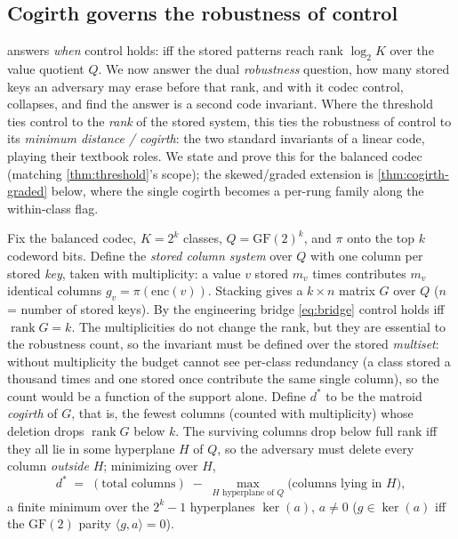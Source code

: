 \documentclass[11pt]{article}
\theoremstyle{definition}
\theoremstyle{plain}
\theoremstyle{remark}
\newcommand{\enc}{\mathrm{enc}}
\newcommand{\GF}{\mathrm{GF}(2)}
\DeclareMathOperator{\rank}{rank}
\newcommand{\proj}{\pi}                     %
\newcommand{\Quot}{Q}                       %
\begin{document}
\subsection{Cogirth governs the robustness of control}
\label{sec:t5b}

 answers \emph{when} control holds: iff the stored patterns reach rank
$\log_2 K$ over the value quotient $\Quot$. We now answer the dual \emph{robustness}
question, how many stored keys an adversary may erase before that rank, and with it codec
control, collapses, and find the answer is a second code invariant. Where the threshold
ties control to the \emph{rank} of the stored system, this ties the robustness of control
to its \emph{minimum distance / cogirth}: the two standard invariants of a linear code,
playing their textbook roles. We state and prove this for the balanced codec (matching
\cref{thm:threshold}'s scope); the skewed/graded extension is \cref{thm:cogirth-graded}
below, where the single cogirth becomes a per-rung family along the within-class flag.

Fix the balanced codec, $K = 2^k$ classes, $\Quot = \GF^k$, and $\proj$ onto the top $k$
codeword bits. Define the \emph{stored column system} over $\Quot$ with one column per
stored \emph{key}, taken with multiplicity: a value $v$ stored $m_v$ times contributes
$m_v$ identical columns $g_v = \proj(\enc(v))$. Stacking gives a $k \times n$ matrix $G$
over $\Quot$ ($n$ = number of stored keys). By the engineering bridge \eqref{eq:bridge}
control holds iff $\rank G = k$. The multiplicities do not change the rank, but they are
essential to the robustness count, so the invariant must be defined over the stored
\emph{multiset}: without multiplicity the budget cannot see per-class redundancy (a class
stored a thousand times and one stored once contribute the same single column), so the count
would be a function of the support alone. Define $d^\ast$ to be the matroid \emph{cogirth} of $G$, that is, the
fewest columns (counted with multiplicity) whose deletion drops $\rank G$ below $k$.
The surviving columns drop below full rank iff they all lie in some hyperplane $H$ of
$\Quot$, so the adversary must delete every column \emph{outside} $H$; minimizing over $H$,
\begin{equation}
  d^\ast \;=\; (\text{total columns}) \;-\; \max_{H \text{ hyperplane of } \Quot}
              \big(\text{columns lying in } H\big),
  \label{eq:cogirth}
\end{equation}
a finite minimum over the $2^k - 1$ hyperplanes $\ker(a)$, $a \ne 0$ ($g \in \ker(a)$ iff
the $\GF$ parity $\langle g, a\rangle = 0$).
\end{document}
